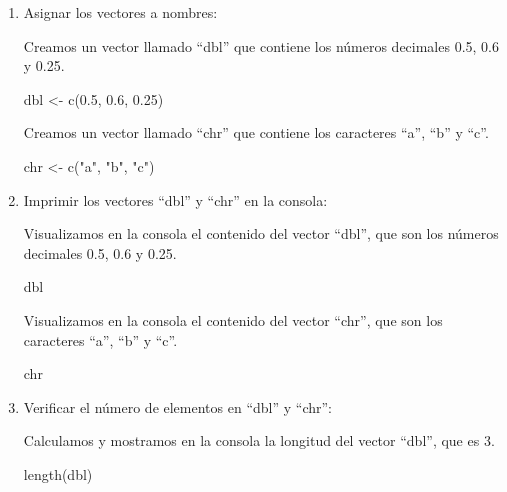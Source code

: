 \documentclass[
  jou,
  floatsintext,
  longtable,
  a4paper,
  nolmodern,
  notxfonts,
  notimes,
  12pt,
  colorlinks=true,linkcolor=blue,citecolor=blue,urlcolor=blue]{apa7}
\newenvironment{Shaded}{\begin{snugshade}}{\end{snugshade}}
\newcommand{\FloatTok}[1]{\textcolor[rgb]{0.68,0.00,0.00}{#1}}
\newcommand{\FunctionTok}[1]{\textcolor[rgb]{0.28,0.35,0.67}{#1}}
\newcommand{\NormalTok}[1]{\textcolor[rgb]{0.00,0.23,0.31}{#1}}
\newcommand{\OtherTok}[1]{\textcolor[rgb]{0.00,0.23,0.31}{#1}}
\newcommand{\StringTok}[1]{\textcolor[rgb]{0.13,0.47,0.30}{#1}}
\begin{document}
\begin{enumerate}
\def\labelenumi{\arabic{enumi}.}
\item
  Asignar los vectores a nombres:

  Creamos un vector llamado ``dbl'' que contiene los números decimales
  0.5, 0.6 y 0.25.

\begin{Shaded}
\begin{Highlighting}[]
\NormalTok{dbl }\OtherTok{\textless{}{-}} \FunctionTok{c}\NormalTok{(}\FloatTok{0.5}\NormalTok{, }\FloatTok{0.6}\NormalTok{, }\FloatTok{0.25}\NormalTok{)}
\end{Highlighting}
\end{Shaded}

  Creamos un vector llamado ``chr'' que contiene los caracteres ``a'',
  ``b'' y ``c''.

\begin{Shaded}
\begin{Highlighting}[]
\NormalTok{chr }\OtherTok{\textless{}{-}} \FunctionTok{c}\NormalTok{(}\StringTok{"a"}\NormalTok{, }\StringTok{"b"}\NormalTok{, }\StringTok{"c"}\NormalTok{)}
\end{Highlighting}
\end{Shaded}
\item
  Imprimir los vectores ``dbl'' y ``chr'' en la consola:

  Visualizamos en la consola el contenido del vector ``dbl'', que son
  los números decimales 0.5, 0.6 y 0.25.

\begin{Shaded}
\begin{Highlighting}[]
\NormalTok{dbl}
\end{Highlighting}
\end{Shaded}

  Visualizamos en la consola el contenido del vector ``chr'', que son
  los caracteres ``a'', ``b'' y ``c''.

\begin{Shaded}
\begin{Highlighting}[]
\NormalTok{chr}
\end{Highlighting}
\end{Shaded}
\item
  Verificar el número de elementos en ``dbl'' y ``chr'':

  Calculamos y mostramos en la consola la longitud del vector ``dbl'',
  que es 3.

\begin{Shaded}
\begin{Highlighting}[]
\FunctionTok{length}\NormalTok{(dbl)}
\end{Highlighting}
\end{Shaded}


\end{enumerate}
\end{document}
